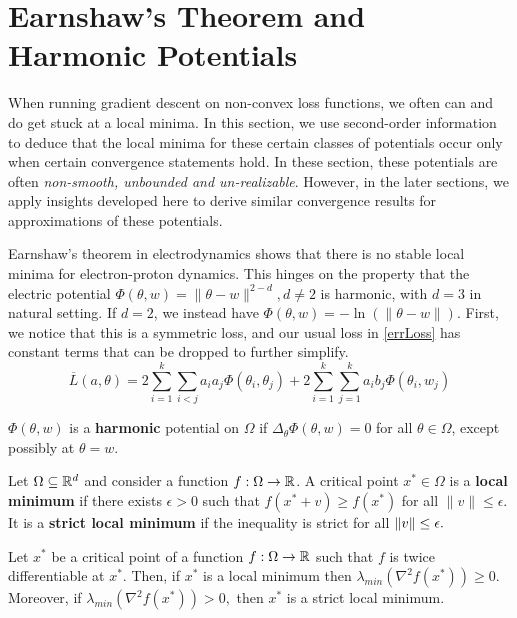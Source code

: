 \section{Earnshaw's Theorem and Harmonic Potentials} 
\label{sec:earnshaw}
%
When running gradient descent on non-convex loss functions, we often
can and do get stuck at a local minima. In this section, we use
second-order information to deduce that the local
minima for these certain classes of potentials occur only when certain convergence statements hold. In these section, these potentials are often {\it non-smooth, unbounded and un-realizable}. However, in the later sections, we apply insights developed here to derive similar convergence results for approximations of these potentials.
%

%
Earnshaw's theorem in electrodynamics shows that there is no stable
local minima for electron-proton dynamics. This hinges on the property
that the electric potential
$\Phi(\theta,w) = \|\theta-w\|^{2-d}, d \neq 2$ is harmonic, with
$d = 3$ in natural setting. If $d = 2$, we instead have
$\Phi(\theta, w) = - \ln(\|\theta - w\|)$. First, we notice that this
is a symmetric loss, and our usual loss in \eqref{errLoss} has
constant terms that can be dropped to further simplify.
%
\begin{equation}\label{errSimp}
\overline{L}(a,\theta) =  2\sum_{i=1}^k\sum_{i < j} a_ia_j\Phi(\theta_i,\theta_j) + 2\sum_{i=1}^k\sum_{j=1}^ka_ib_j \Phi(\theta_i,w_j)
\end{equation} 
%
\begin{definition}
$\Phi(\theta,w)$ is a {\bf harmonic} potential on $\Omega$ if $\Delta_\theta \Phi(\theta,w) = 0$ for all $\theta \in \Omega$, except possibly at $\theta = w$.
\end{definition}

\begin{definition}
  Let $\Omega \subseteq {\mathbb{R}}^d$ and consider a function
  $f:\Omega \to {\mathbb{R}}$. A critical point $x^* \in \Omega$ is a {\bf local
    minimum} if there exists $\epsilon > 0$ such that
  $f(x^*+v) \geq f(x^*)$ for all $\|v\|\leq \epsilon$. It is a {\bf
    strict local minimum} if the inequality is strict for all
  $\left\lVert v \right\rVert \le \epsilon.$
\end{definition} 
%
\begin{fact}
  Let $x^*$ be a critical point of a function $f : \Omega \to {\mathbb{R}}$ such
  that $f$ is twice differentiable at $x^*.$ Then, if $x^*$ is a local
  minimum then $\lambda_{min}(\nabla^2 f(x^*)) \geq 0.$ Moreover, if
  $\lambda_{min}(\nabla^2 f(x^*)) > 0,$ then $x^*$ is a strict local minimum.
\end{fact}
%

